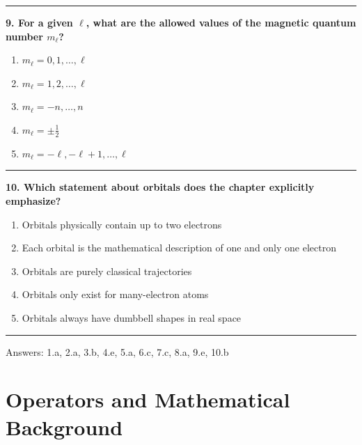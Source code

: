 \documentclass[
  english,
  9pt,
]{extbook}
\providecommand{\tightlist}{%
  \setlength{\itemsep}{0pt}\setlength{\parskip}{0pt}}
\theoremstyle{definition}
\theoremstyle{definition}
\theoremstyle{definition}
\theoremstyle{definition}
\theoremstyle{remark}
\begin{document}
\begin{center}\rule{0.5\linewidth}{0.5pt}\end{center}

\textbf{9. For a given \(\ell\), what are the allowed values of the magnetic quantum number \(m_\ell\)?}

\begin{enumerate}
\def\labelenumi{\alph{enumi}.}
\tightlist
\item
  \(m_\ell = 0,1,\dots,\ell\)\\
\item
  \(m_\ell = 1,2,\dots,\ell\)\\
\item
  \(m_\ell = -n,\dots,n\)\\
\item
  \(m_\ell = \pm \tfrac{1}{2}\)\\
\item
  \(m_\ell = -\ell, -\ell+1, \dots, \ell\)
\end{enumerate}

\begin{center}\rule{0.5\linewidth}{0.5pt}\end{center}

\textbf{10. Which statement about orbitals does the chapter explicitly emphasize?}

\begin{enumerate}
\def\labelenumi{\alph{enumi}.}
\tightlist
\item
  Orbitals physically contain up to two electrons\\
\item
  Each orbital is the mathematical description of one and only one electron\\
\item
  Orbitals are purely classical trajectories\\
\item
  Orbitals only exist for many-electron atoms\\
\item
  Orbitals always have dumbbell shapes in real space
\end{enumerate}

\begin{center}\rule{0.5\linewidth}{0.5pt}\end{center}

Answers: 1.a, 2.a, 3.b, 4.e, 5.a, 6.c, 7.c, 8.a, 9.e, 10.b

\chapter{Operators and Mathematical Background}\label{Operators}
\end{document}
